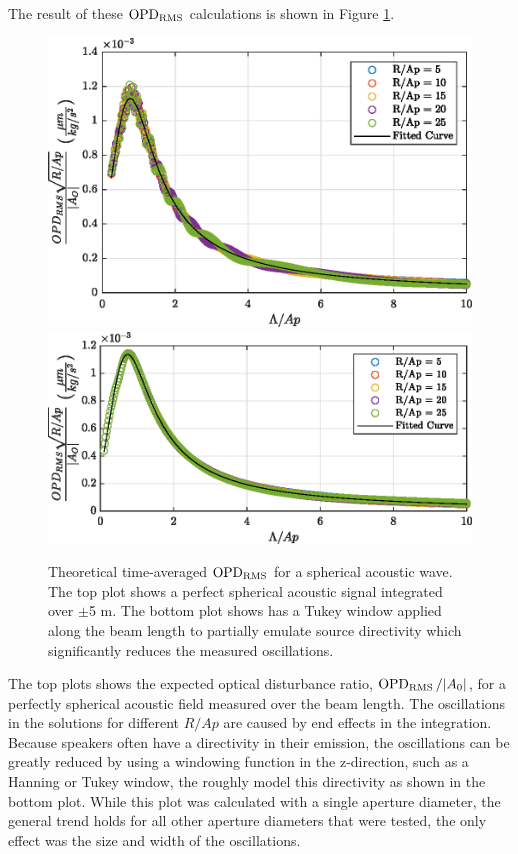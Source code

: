 The result of these $\operatorname{OPD_{RMS}}$ calculations is shown in Figure \ref{fig:03_spherical_sample}.
\begin{figure}
  \centering
  \includegraphics{../matlab/03_aero_optics_acoustics/spherical_sample.eps}
  \includegraphics{../matlab/03_aero_optics_acoustics/spherical_sample_win.eps}
  \caption{Theoretical time-averaged $\operatorname{OPD_{RMS}}$ for a spherical acoustic wave. The top plot shows a perfect spherical acoustic signal integrated over $\pm$5 m. The bottom plot shows has a Tukey window applied along the beam length to partially emulate source directivity which significantly reduces the measured oscillations.}
  \label{fig:03_spherical_sample}
\end{figure}
The top plots shows the expected optical disturbance ratio, $\operatorname{OPD_{RMS}}/|A_0|$, for a perfectly spherical acoustic field measured over the beam length.
The oscillations in the solutions for different $R/Ap$ are caused by end effects in the integration.
Because speakers often have a directivity in their emission, the oscillations can be greatly reduced by using a windowing function in the z-direction, such as a Hanning or Tukey window, the roughly model this directivity as shown in the bottom plot.
While this plot was calculated with a single aperture diameter, the general trend holds for all other aperture diameters that were tested, the only effect was the size and width of the oscillations.

